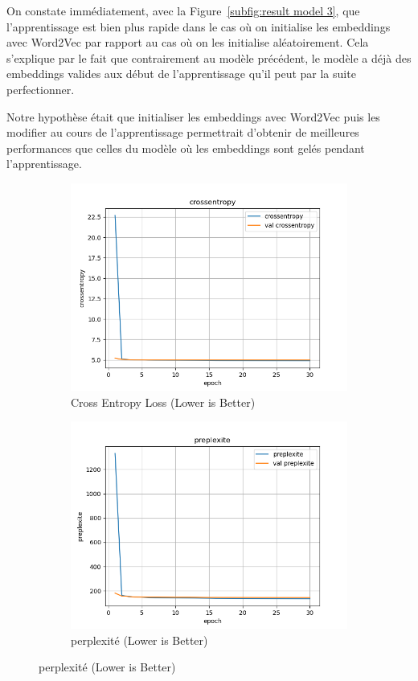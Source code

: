 \documentclass[a4paper]{article}
\begin{document}
On constate immédiatement, avec la Figure~\ref{subfig:result model 3}, que l'apprentissage est bien plus rapide dans le cas où on 
initialise les embeddings avec Word2Vec par rapport au cas où on les initialise aléatoirement. Cela s'explique par le fait que 
contrairement au modèle précédent, le modèle a déjà des embeddings valides aux début de l'apprentissage qu'il peut par la suite 
perfectionner.

Notre hypothèse était que initialiser les embeddings avec Word2Vec puis les modifier au cours de l'apprentissage permettrait 
d'obtenir de meilleures performances que celles du modèle où les embeddings sont gelés pendant l'apprentissage. 


\begin{figure}[ht]
  \centering
  \begin{subfigure}{0.47\textwidth}
    \includegraphics[width=\linewidth]{../logs/learnfromword2vect_0/crossentropy.png}
    \caption{Cross Entropy Loss (Lower is Better)}
  \end{subfigure}
  \hfill
  \begin{subfigure}{0.47\textwidth}
    \includegraphics[width=\linewidth]{../logs/learnfromword2vect_0/preplexite.png}
    \caption{perplexité (Lower is Better)}
  \end{subfigure}


\end{figure}
\end{document}
